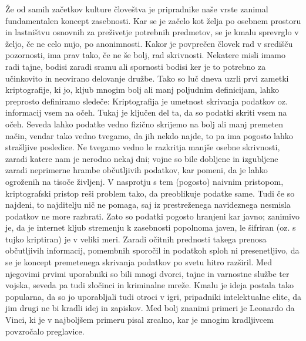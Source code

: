 \documentclass[a4paper, 12pt]{article} %
\begin{document}
Že od samih začetkov kulture človeštva je pripradnike naše vrste zanimal fundamentalen koncept zasebnosti. Kar se je začelo kot želja po osebnem prostoru in lastništvu osnovnih za preživetje potrebnih predmetov, se je kmalu sprevrglo v željo, če ne celo nujo, po anonimnosti. Kakor je povprečen človek rad v središču pozornosti, ima prav tako, če ne še bolj, rad skrivnosti. Nekatere misli imamo radi tajne, bodisi zaradi sramu ali spornosti bodisi ker je to potrebno za učinkovito in neovirano delovanje družbe.
\newline
\newline
Tako so luč dneva uzrli prvi zametki kriptografije, ki jo, kljub mnogim bolj ali manj poljudnim definicijam, lahko preprosto definiramo sledeče:
\newline
Kriptografija je umetnost skrivanja podatkov oz. informacij vsem na očeh.
\newline
\newline
Tukaj je ključen del ta, da so podatki skriti vsem na očeh. Seveda lahko podatke vedno fizično skrijemo na bolj ali manj premeten način, vendar tako vedno tvegamo, da jih nekdo najde, to pa ima pogosto lahko strašljive posledice. Ne tvegamo vedno le razkritja manjše osebne skrivnosti, zaradi katere nam je nerodno nekaj dni; vojne so bile dobljene in izgubljene zaradi neprimerne hrambe občutljivih podatkov, kar pomeni, da je lahko ogroženih na tisoče življenj.
\newline
\newline
V nasprotju s tem (pogosto) naivnim pristopom, kriptografski pristop reši problem tako, da preoblikuje podatke same. Tudi če so najdeni, to najditelju nič ne pomaga, saj iz prestreženega navideznega nesmisla podatkov ne more razbrati. Zato so podatki pogosto hranjeni kar javno; zanimivo je, da je internet kljub stremenju k zasebnosti popolnoma javen, le šifriran (oz. s tujko kriptiran) je v veliki meri.
\newline
\newline
Zaradi očitnih prednosti takega prenosa občutljivih informacij, pomembnih sporočil in podatkoh sploh ni presenetljivo, da se je koncept premetenega skrivanja podatkov po svetu hitro razširil. Med njegovimi prvimi uporabniki so bili mnogi dvorci, tajne in varnostne službe ter vojska, seveda pa tudi zločinci in kriminalne mreže. Kmalu je ideja postala tako popularna, da so jo uporabljali tudi otroci v igri, pripadniki intelektualne elite, da jim drugi ne bi kradli idej in zapiskov. Med bolj znanimi primeri je Leonardo da Vinci, ki je v najboljšem primeru pisal zrcalno, kar je mnogim kradljivcem povzročalo preglavice.
\end{document}
